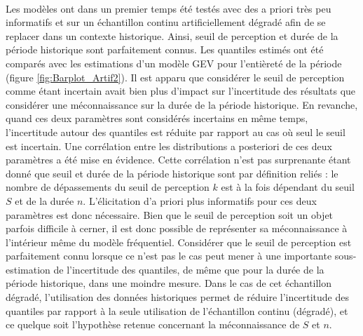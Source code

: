 \documentclass[11pt]{article}
\begin{document}
	\paragraph{} Les modèles ont dans un premier temps été testés avec des a priori très peu informatifs et sur un échantillon continu artificiellement dégradé afin de se replacer dans un contexte historique. Ainsi, seuil de perception et durée de la période historique sont parfaitement connus. Les quantiles estimés ont été comparés avec les estimations d'un modèle GEV pour l'entièreté de la période (figure \ref{fig:Barplot_Artif2}). Il est apparu que considérer le seuil de perception comme étant incertain avait bien plus d'impact sur l'incertitude des résultats que considérer une méconnaissance sur la durée de la période historique. En revanche, quand ces deux paramètres sont considérés incertains en même temps, l'incertitude autour des quantiles est réduite par rapport au cas où seul le seuil est incertain. Une corrélation entre les distributions a posteriori de ces deux paramètres a été mise en évidence. Cette corrélation n'est pas surprenante étant donné que seuil et durée de la période historique sont par définition reliés : le nombre de dépassements du seuil de perception $k$ est à la fois dépendant du seuil $S$ et de la durée $n$. L'élicitation d'a priori plus informatifs pour ces deux paramètres est donc nécessaire. Bien que le seuil de perception soit un objet parfois difficile à cerner, il est donc possible de représenter sa méconnaissance à l'intérieur même du modèle fréquentiel. Considérer que le seuil de perception est parfaitement connu lorsque ce n'est pas le cas peut mener à une importante sous-estimation de l'incertitude des quantiles, de même que pour la durée de la période historique, dans une moindre mesure. Dans le cas de cet échantillon dégradé, l'utilisation des données historiques permet de réduire l'incertitude des quantiles par rapport à la seule utilisation de l'échantillon continu (dégradé), et ce quelque soit l'hypothèse retenue concernant la méconnaissance de $S$ et $n$.
	
\end{document}
